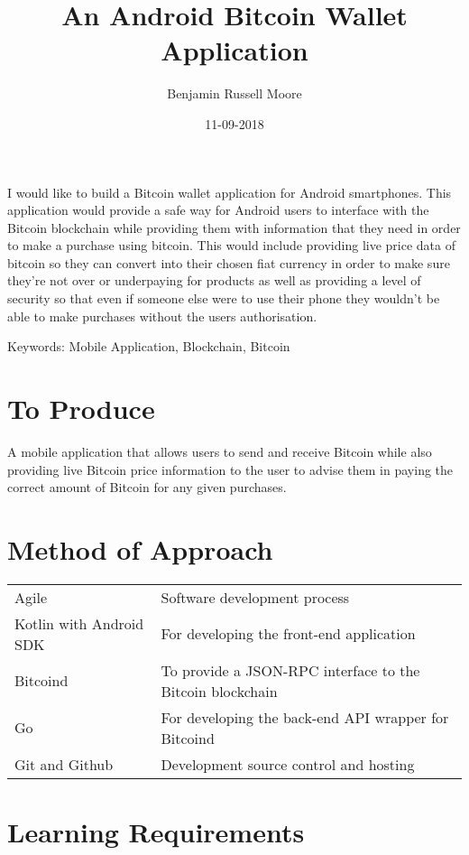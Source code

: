 \documentclass{article}
\title{An Android Bitcoin Wallet Application}
\author{Benjamin Russell Moore}
\date{11-09-2018}
\begin{document}
\maketitle

I would like to build a Bitcoin wallet application for Android smartphones. This
application would provide a safe way for Android users to interface with the
Bitcoin blockchain while providing them with information that they need in order
to make a purchase using bitcoin. This would include providing live price data
of bitcoin so they can convert into their chosen fiat currency in order to make
sure they're not over or underpaying for products as well as providing a level
of security so that even if someone else were to use their phone they wouldn't
be able to make purchases without the users authorisation.

\vspace{5mm}

Keywords: Mobile Application, Blockchain, Bitcoin

\section{To Produce}

A mobile application that allows users to send and receive Bitcoin while also
providing live Bitcoin price information to the user to advise them in paying
the correct amount of Bitcoin for any given purchases.

\section{Method of Approach}

\begin{center}
\begin{tabular}{ l l }
 Agile & Software development process \\ 
 Kotlin with Android SDK & For developing the front-end application \\  
 Bitcoind & To provide a JSON-RPC interface to the Bitcoin blockchain \\  
 Go & For developing the back-end API wrapper for Bitcoind \\  
 Git and Github & Development source control and hosting
\end{tabular}
\end{center}

\section{Learning Requirements}
\end{document}
